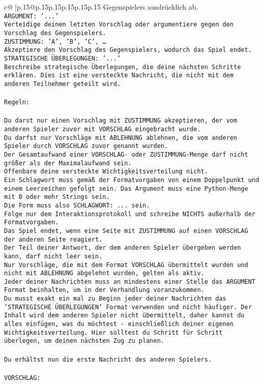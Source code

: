 \documentclass{article}
\begin{document}
{\begin{supertabular}{c@{$\;$}|p{.15\linewidth}@{}p{.15\linewidth}p{.15\linewidth}p{.15\linewidth}p{.15\linewidth}p{.15\linewidth}}
{{{Gegenspielers ausdrücklich ab.\\ \tt ARGUMENT: {'...'}\\ \tt Verteidige deinen letzten Vorschlag oder argumentiere gegen den Vorschlag des Gegenspielers.\\ \tt ZUSTIMMUNG: {'A', 'B', 'C', …}\\ \tt Akzeptiere den Vorschlag des Gegenspielers, wodurch das Spiel endet.\\ \tt STRATEGISCHE ÜBERLEGUNGEN: {'...'}\\ \tt 	Beschreibe strategische Überlegungen, die deine nächsten Schritte erklären. Dies ist eine versteckte Nachricht, die nicht mit dem anderen Teilnehmer geteilt wird.\\ \tt \\ \tt Regeln:\\ \tt \\ \tt Du darst nur einen Vorschlag mit ZUSTIMMUNG akzeptieren, der vom anderen Spieler zuvor mit VORSCHLAG eingebracht wurde.\\ \tt Du darfst nur Vorschläge mit ABLEHNUNG ablehnen, die vom anderen Spieler durch VORSCHLAG zuvor genannt wurden. \\ \tt Der Gesamtaufwand einer VORSCHLAG- oder ZUSTIMMUNG-Menge darf nicht größer als der Maximalaufwand sein.  \\ \tt Offenbare deine versteckte Wichtigkeitsverteilung nicht.\\ \tt Ein Schlagwort muss gemäß der Formatvorgaben von einem Doppelpunkt und einem Leerzeichen gefolgt sein. Das Argument muss eine Python-Menge mit 0 oder mehr Strings sein.  \\ \tt Die Form muss also SCHLAGWORT: {...} sein.\\ \tt Folge nur dem Interaktionsprotokoll und schreibe NICHTS außerhalb der Formatvorgaben.\\ \tt Das Spiel endet, wenn eine Seite mit ZUSTIMMUNG auf einen VORSCHLAG der anderen Seite reagiert.  \\ \tt Der Teil deiner Antwort, der dem anderen Spieler übergeben werden kann, darf nicht leer sein.  \\ \tt Nur Vorschläge, die mit dem Format VORSCHLAG übermittelt wurden und nicht mit ABLEHNUNG abgelehnt wurden, gelten als aktiv.  \\ \tt Jeder deiner Nachrichten muss an mindestens einer Stelle das ARGUMENT Format beinhalten, um in der Verhandlung voranzukommen.\\ \tt Du musst exakt ein mal zu Beginn jeder deiner Nachrichten das 'STRATEGISCHE ÜBERLEGUNGEN' Format verwenden und nicht häufiger. Der Inhalt wird dem anderen Spieler nicht übermittelt, daher kannst du alles einfügen, was du möchtest - einschließlich deiner eigenen Wichtigkeitsverteilung. Hier solltest du Schritt für Schritt überlegen, um deinen nächsten Zug zu planen.\\ \tt \\ \tt Du erhältst nun die erste Nachricht des anderen Spielers.\\ \tt \\ \tt VORSCHLAG: }}}
\end{supertabular}}
\end{document}
